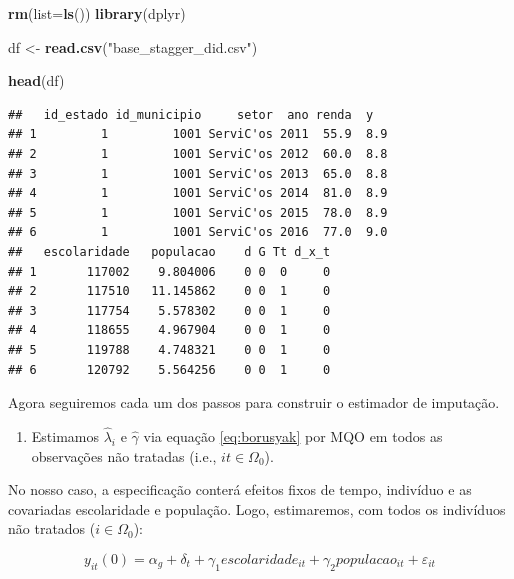 \documentclass[portugues]{article}
\newenvironment{Shaded}{\begin{snugshade}}{\end{snugshade}}
\newcommand{\AttributeTok}[1]{\textcolor[rgb]{0.13,0.29,0.53}{#1}}
\newcommand{\FunctionTok}[1]{\textcolor[rgb]{0.13,0.29,0.53}{\textbf{#1}}}
\newcommand{\NormalTok}[1]{#1}
\newcommand{\OtherTok}[1]{\textcolor[rgb]{0.56,0.35,0.01}{#1}}
\newcommand{\StringTok}[1]{\textcolor[rgb]{0.31,0.60,0.02}{#1}}
\begin{document}
\begin{box_code}

\begin{Shaded}
\begin{Highlighting}[]
\FunctionTok{rm}\NormalTok{(}\AttributeTok{list=}\FunctionTok{ls}\NormalTok{())}
\FunctionTok{library}\NormalTok{(dplyr)}

\NormalTok{df }\OtherTok{\textless{}{-}} \FunctionTok{read.csv}\NormalTok{(}\StringTok{"base\_stagger\_did.csv"}\NormalTok{)}

\FunctionTok{head}\NormalTok{(df)}
\end{Highlighting}
\end{Shaded}

\begin{verbatim}
##   id_estado id_municipio     setor  ano renda  y
## 1         1         1001 ServiC'os 2011  55.9  8.9    
## 2         1         1001 ServiC'os 2012  60.0  8.8    
## 3         1         1001 ServiC'os 2013  65.0  8.8    
## 4         1         1001 ServiC'os 2014  81.0  8.9    
## 5         1         1001 ServiC'os 2015  78.0  8.9    
## 6         1         1001 ServiC'os 2016  77.0  9.0    
##   escolaridade   populacao    d G Tt d_x_t
## 1       117002    9.804006    0 0  0     0
## 2       117510   11.145862    0 0  1     0
## 3       117754    5.578302    0 0  1     0
## 4       118655    4.967904    0 0  1     0
## 5       119788    4.748321    0 0  1     0
## 6       120792    5.564256    0 0  1     0
\end{verbatim}


\end{box_code}

Agora seguiremos cada um dos passos para construir o estimador de imputação. 

\begin{enumerate}
    \item Estimamos $\hat{\lambda}_i$ e $\hat{\gamma}$ via equação \ref{eq:borusyak} por MQO em todos as observações não tratadas (i.e., $it \in \Omega_0$).
\end{enumerate}

No nosso caso, a especificação conterá efeitos fixos de tempo, indivíduo e as covariadas escolaridade e população. Logo, estimaremos, com todos os indivíduos não tratados ($i \in \Omega_0$):

\begin{equation*}
     y_{it}(0) = \alpha_g + \delta_t + \gamma_1 escolaridade_{it} + \gamma_2 populacao_{it} + \varepsilon_{it}
\end{equation*}
\end{document}
